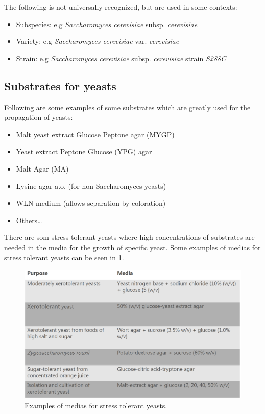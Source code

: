 The following is not universally recognized, but are used in some contexts:
\begin{highlight}
    \begin{itemize}
        \item Subspecies: e.g \textit{Saccharomyces cerevisiae} subsp. \textit{cerevisiae}
        \item Variety: e.g \textit{Saccharomyces cerevisiae} var. \textit{cerevisiae}
        \item Strain: e.g \textit{Saccharomyces cerevisiae} subsp. \textit{cerevisiae} strain \textit{S288C}
    \end{itemize}
\end{highlight}

\subsection{Substrates for yeasts}
Following are some examples of some substrates which are greatly used for the propagation of yeasts:

\begin{highlight}
    \begin{itemize}
        \item Malt yeast extract Glucose Peptone agar (MYGP)
        \item Yeast extract Peptone Glucose (YPG) agar
        \item Malt Agar (MA)
        \item Lysine agar a.o. (for non-Saccharomyces yeasts)
        \item WLN medium (allows separation by coloration)
        \item Others\dots
    \end{itemize}
\end{highlight}

There are som stress tolerant yeasts where high concentrations of substrates are needed in the media for the growth of specific yeast. Some examples of medias for stress tolerant yeasts can be seen in \ref{fig:StressTolerantYeasts}.

\begin{figure}[h]
    \centering
    \includegraphics[width=1\textwidth]{Figures/StressTolerantYeast.png}
    \caption{Examples of medias for stress tolerant yeasts.}
    \label{fig:StressTolerantYeasts}
\end{figure}


